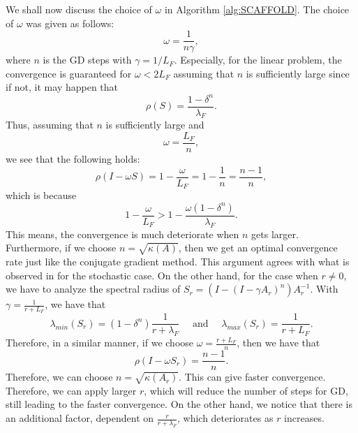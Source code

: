 \begin{itemize}
\begin{remark} 
We shall now discuss the choice of $\omega$ in Algorithm \ref{alg:SCAFFOLD}. The choice of $\omega$ was given as follows: 
\begin{equation} 
\omega = \frac{1}{n\gamma },
\end{equation}
where $n$ is the GD steps with $\gamma = 1/L_F$. Especially, for the linear problem, the convergence is guaranteed for $\omega < 2L_F$ assuming that $n$ is sufficiently large since if not, it may happen that 
\begin{equation}
\rho(S) = \frac{1 - \delta^n}{\lambda_F}. 
\end{equation}
Thus, assuming that $n$ is sufficiently large and 
\begin{equation}
\omega = \frac{L_F}{n},
\end{equation}
we see that the following holds: 
\begin{equation}
\rho(I - \omega S) = 1 - \frac{\omega}{L_F} = 1 - \frac{1}{n} = \frac{n - 1}{n},  
\end{equation} 
which is because 
\begin{equation}
1 - \frac{\omega}{L_F} > 1 - \frac{\omega(1 - \delta^n)}{\lambda_F}.  
\end{equation}
This means, the convergence is much deteriorate when $n$ gets larger. Furthermore, if we choose $n = \sqrt{\kappa(A)}$, then we get an optimal convergence rate just like the conjugate gradient method. This argument agrees with what is observed in \cite{mishchenko2022proxskip} for the stochastic case. On the other hand, for the case when $r \neq 0$, we have to analyze the spectral radius of $S_r = (I - (I - \gamma A_r)^n)A_r^{-1}$. With $\gamma = \frac{1}{r + L_F}$, we have that
\begin{equation}
\lambda_{min}(S_r) = (1 - \delta^n) \frac{1}{r + \lambda_F} \quad \mbox{ and } \quad \lambda_{max}(S_r) = \frac{1}{r+L_F}. 
\end{equation} 
Therefore, in a similar manner, if we choose $\omega = \frac{r + L_F}{n}$, then we have that 
\begin{equation}
\rho(I - \omega S_r) = \frac{n-1}{n}. 
\end{equation}
Therefore, we can choose $n = \sqrt{\kappa(A_r)}$. This can give faster convergence. Therefore, we can apply larger $r$, which will reduce the number of steps for GD, still leading to the faster convergence. On the other hand, we notice that there is an additional factor, dependent on $\frac{r}{r+\lambda_F}$, which deteriorates as $r$ increases. 
\end{remark}



\end{itemize}
